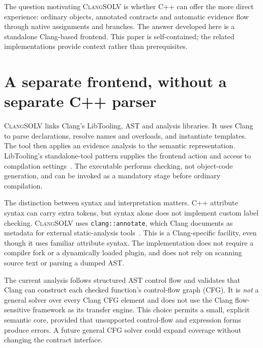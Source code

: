\documentclass[11pt]{article}
\newcommand{\clangsolv}{\textsc{ClangSOLV}}
\begin{document}
The question motivating \clangsolv{} is whether C++ can offer the more direct
experience: ordinary objects, annotated contracts and automatic evidence flow
through native assignments and branches. The answer developed here is a
standalone Clang-based frontend. This paper is self-contained; the related
implementations provide context rather than prerequisites.

\section{A separate frontend, without a separate C++ parser}
\clangsolv{} links Clang's LibTooling, AST and analysis libraries. It uses Clang
to parse declarations, resolve names and overloads, and instantiate templates.
The tool then applies an evidence analysis to the semantic representation.
LibTooling's standalone-tool pattern supplies the frontend action and access
to compilation settings~\cite{tooling}. The executable performs checking,
not object-code generation, and can be invoked as a mandatory stage before
ordinary compilation.

The distinction between syntax and interpretation matters. C++ attribute
syntax can carry extra tokens, but syntax alone does not implement custom
label checking. \clangsolv{} uses \texttt{clang::annotate}, which Clang documents
as metadata for external static-analysis tools~\cite{annotate}. This is a
Clang-specific facility, even though it uses familiar attribute syntax. The
implementation does not require a compiler fork or a dynamically loaded
plugin, and does not rely on scanning source text or parsing a dumped AST.

The current analysis follows structured AST control flow and validates that
Clang can construct each checked function's control-flow graph (CFG). It is
\emph{not} a general solver over every Clang CFG element and does not use the
Clang flow-sensitive framework as its transfer engine. This choice permits a
small, explicit semantic core, provided that unsupported control-flow and
expression forms produce errors. A future general CFG solver could expand
coverage without changing the contract interface.
\end{document}

